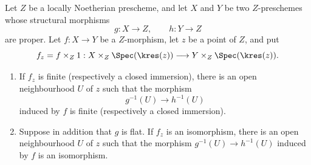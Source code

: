 \begin{proposition}[4.6.7]
\label{III.4.6.7}
Let $Z$ be a locally Noetherian prescheme, and let $X$ and $Y$ be
two $Z$-preschemes whose structural morphisms
\[
  g:X\longrightarrow Z,\qquad h:Y\longrightarrow Z
\]
are proper.  Let $f:X\to Y$ be a $Z$-morphism, let $z$ be a point
of $Z$, and put
\[
  f_z=f\times_Z1:
  X\times_Z\Spec(\kres(z))
  \longrightarrow
  Y\times_Z\Spec(\kres(z)).
\]
\begin{enumerate}
\item[(i)] If $f_z$ is finite (respectively a closed immersion),
  there is an open neighbourhood $U$ of $z$ such that the morphism
  \[
    g^{-1}(U)\longrightarrow h^{-1}(U)
  \]
  induced by $f$ is finite (respectively a closed immersion).
\item[(ii)] Suppose in addition that $g$ is flat.  If $f_z$ is an
  isomorphism, there is an open neighbourhood $U$ of $z$ such that
  the morphism $g^{-1}(U)\to h^{-1}(U)$ induced by $f$ is an
  isomorphism.
\end{enumerate}
\end{proposition}

